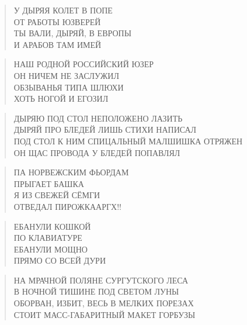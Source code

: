 \poemtitle{***}
\begin{verse}
У ДЫРЯЯ КОЛЕТ В ПОПЕ\\
ОТ РАБОТЫ ЮЗВЕРЕЙ\\
ТЫ ВАЛИ, ДЫРЯЙ, В ЕВРОПЫ\\
И АРАБОВ ТАМ ИМЕЙ
\end{verse}

\poemtitle{***}
\begin{verse}
НАШ РОДНОЙ РОССИЙСКИЙ ЮЗЕР\\
ОН НИЧЕМ НЕ ЗАСЛУЖИЛ\\
ОБЗЫВАНЬЯ ТИПА ШЛЮХИ\\
ХОТЬ НОГОЙ И ЕГОЗИЛ
\end{verse}

\poemtitle{***}
\begin{verse}
ДЫРЯЮ ПОД СТОЛ НЕПОЛОЖЕНО ЛАЗИТЬ\\
ДЫРЯЙ ПРО БЛЕДЕЙ ЛИШЬ СТИХИ НАПИСАЛ\\
ПОД СТОЛ К НИМ СПИЦАЛЬНЫЙ МАЛШИШКА ОТРЯЖЕН\\
ОН ЩАС ПРОВОДА У БЛЕДЕЙ ПОПАВЛЯЛ
\end{verse}

\poemtitle{***}
\begin{verse}
ПА НОРВЕЖСКИМ ФЬОРДАМ\\
ПРЫГАЕТ БАШКА\\
Я ИЗ СВЕЖЕЙ СЁМГИ\\
ОТВЕДАЛ ПИРОЖКААРГХ!!
\end{verse}

\poemtitle{***}
\begin{verse}
ЕБАНУЛИ КОШКОЙ \\
ПО КЛАВИАТУРЕ\\
ЕБАНУЛИ МОЩНО\\
ПРЯМО СО ВСЕЙ ДУРИ
\end{verse}

\poemtitle{***}
\begin{verse}
НА МРАЧНОЙ ПОЛЯНЕ СУРГУТСКОГО ЛЕСА\\
В НОЧНОЙ ТИШИНЕ ПОД СВЕТОМ ЛУНЫ\\
ОБОРВАН, ИЗБИТ, ВЕСЬ В МЕЛКИХ ПОРЕЗАХ\\
СТОИТ МАСС-ГАБАРИТНЫЙ МАКЕТ ГОРБУЗЫ
\end{verse}

